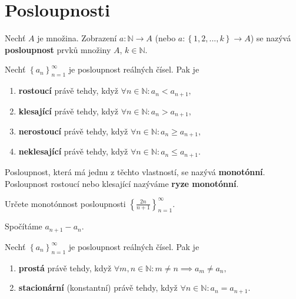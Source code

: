 \section{Posloupnosti}
\begin{definition}
Nechť $A$ je množina. Zobrazení $a:\mathbb N\to A$ (nebo $a:\left \{ 1,2,...,k \right \} \to A$)
se nazývá \textbf{posloupnost} prvků množiny $A$, $k\in \mathbb N.$
\end{definition}

\begin{definition}
Nechť $\left \{ a_n \right \}_{n=1}^\infty $ je posloupnost reálných čísel. Pak je
\begin{enumerate}[$i.$]
\item \textbf{rostoucí} právě tehdy, když $\forall n \in \mathbb N: a_n< a_{n+1},$
\item \textbf{klesající} právě tehdy, když $\forall n \in \mathbb N: a_n> a_{n+1},$
\item \textbf{nerostoucí} právě tehdy, když $\forall n \in \mathbb N: a_n\geq a_{n+1},$
\item \textbf{neklesající} právě tehdy, když $\forall n \in \mathbb N: a_n\leq a_{n+1}.$
\end{enumerate}
Posloupnost, která má jednu z těchto vlastností, se nazývá \textbf{monotónní}.
Posloupnost rostoucí nebo klesající nazýváme \textbf{ryze monotónní}.
\end{definition}

\begin{priklad}
Určete monotónnost posloupnosti $\left \{ \frac{2n}{n+1} \right \}_{n=1}^\infty $.
\end{priklad}

\begin{reseni}
Spočítáme $a_{n+1}-a_n$.
\end{reseni}

\begin{definition}
    Nechť $\left \{ a_n \right \}_{n=1}^\infty $ je posloupnost reálných čísel. Pak je
    \begin{enumerate}[$i.$]
    \item \textbf{prostá} právě tehdy, když $\forall m,n\in \mathbb N: m\ne n \implies a_m\ne a_n,$
   	\item \textbf{stacionární} (konstantní) právě tehdy, když $\forall n \in \mathbb N:a_n = a_{n+1}.$
    \end{enumerate}
\end{definition}

